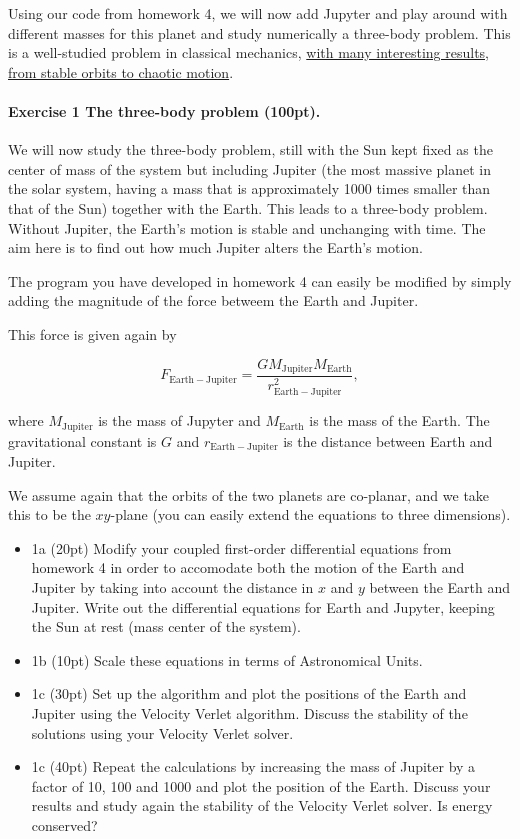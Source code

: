 \documentclass[%
oneside,                 %
final,                   %
10pt]{article}
\begin{document}
Using our code from homework 4, we will now add Jupyter and play
around with different masses for this planet and study numerically a
three-body problem.  This is a well-studied problem in classical
mechanics, \href{{https://en.wikipedia.org/wiki/Three-body_problem}}{with many interesting results, from stable orbits to chaotic motion}.

\paragraph{Exercise 1 The three-body problem (100pt).}
We will now study the three-body problem, still with the Sun kept
fixed as the center of mass of the system but including Jupiter (the
most massive planet in the solar system, having a mass that is
approximately 1000 times smaller than that of the Sun) together with
the Earth. This leads to a three-body problem. Without Jupiter, the
Earth's motion is stable and unchanging with time. The aim here is to
find out how much Jupiter alters the Earth's motion.

The program you have developed in homework 4 can easily be modified by
simply adding the magnitude of the force betweem the Earth and
Jupiter.

This force is given again by

\[
F_{\mathrm{Earth-Jupiter}}=\frac{GM_{\mathrm{Jupiter}}M_{\mathrm{Earth}}}{r_{\mathrm{Earth-Jupiter}}^2},
\]

where $M_{\mathrm{Jupiter}}$ is the mass of Jupyter and
$M_{\mathrm{Earth}}$ is the mass of the Earth.  The gravitational constant
is $G$ and $r_{\mathrm{Earth-Jupiter}}$ is the distance between Earth
and Jupiter.

We assume again that the orbits of the two planets are co-planar, and
we take this to be the $xy$-plane (you can easily extend the equations
to three dimensions).

\begin{itemize}
\item 1a (20pt) Modify your coupled first-order differential equations from homework 4 in order to accomodate both the motion of the Earth and Jupiter by taking into account the distance in $x$ and $y$ between the Earth and Jupiter. Write out the differential equations for  Earth and Jupyter, keeping the Sun at rest (mass center of the system).

\item 1b (10pt) Scale these equations in terms of Astronomical Units.

\item 1c (30pt) Set up the algorithm and plot the positions of the Earth and Jupiter using the Velocity Verlet algorithm. Discuss the stability of the solutions using your Velocity Verlet solver.

\item 1c (40pt)  Repeat the calculations by increasing the mass of Jupiter by a factor of 10, 100 and 1000 and plot the position of the Earth.  Discuss your results and study again the stability of the Velocity Verlet solver. Is energy conserved? 
\end{itemize}
\end{document}
